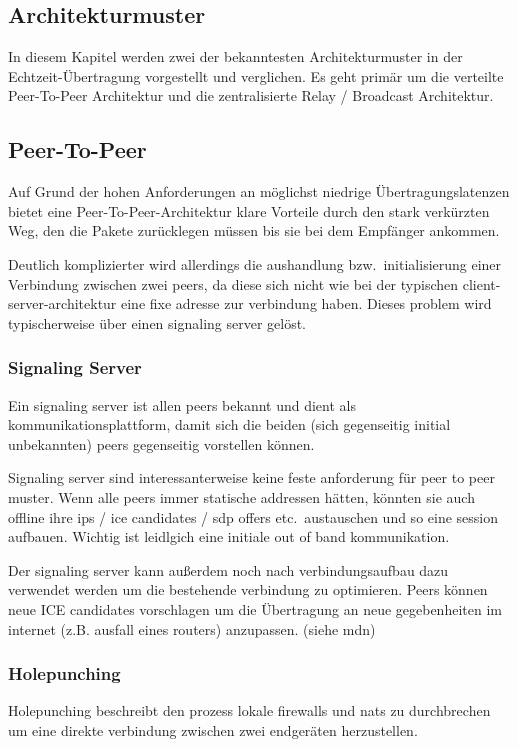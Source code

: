 \documentclass[journal]{IEEEtran}
\begin{document}
\begin{twocolumn}
\section{Architekturmuster}

In diesem Kapitel werden zwei der bekanntesten Architekturmuster in der
Echtzeit-Übertragung vorgestellt und verglichen. Es geht primär um die
verteilte Peer-To-Peer Architektur und die zentralisierte Relay / Broadcast
Architektur.

\subsection{Peer-To-Peer}

Auf Grund der hohen Anforderungen an möglichst niedrige Übertragungslatenzen
bietet eine Peer-To-Peer-Architektur klare Vorteile durch den stark verkürzten
Weg, den die Pakete zurücklegen müssen bis sie bei dem Empfänger ankommen.

Deutlich komplizierter wird allerdings die aushandlung bzw.\ initialisierung
einer Verbindung zwischen zwei peers, da diese sich nicht wie bei der typischen
client-server-architektur eine fixe adresse zur verbindung haben. Dieses
problem wird typischerweise über einen signaling server gelöst.

\subsubsection{Signaling Server}
Ein signaling server ist allen peers bekannt und dient als
kommunikationsplattform, damit sich die beiden (sich gegenseitig initial
unbekannten) peers gegenseitig vorstellen können.

Signaling server sind interessanterweise keine feste anforderung für peer to
peer muster. Wenn alle peers immer statische addressen hätten, könnten sie auch
offline ihre ips / ice candidates / sdp offers etc.\ austauschen und so eine
session aufbauen. Wichtig ist leidlgich eine initiale out of band
kommunikation.

Der signaling server kann außerdem noch nach verbindungsaufbau dazu verwendet
werden um die bestehende verbindung zu optimieren. Peers können neue ICE
candidates vorschlagen um die Übertragung an neue gegebenheiten im internet
(z.B. ausfall eines routers) anzupassen. (siehe mdn)


\subsubsection{Holepunching}
Holepunching beschreibt den prozess lokale firewalls und nats zu durchbrechen
um eine direkte verbindung zwischen zwei endgeräten herzustellen.


\end{twocolumn}
\end{document}
